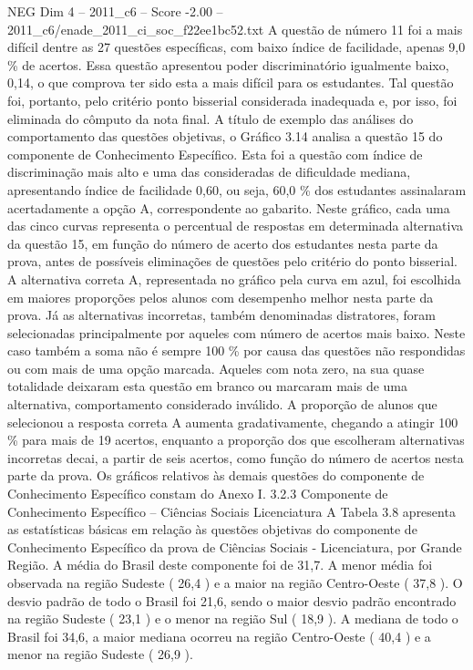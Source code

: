 \begin{textsample}{NEG Dim 4 – 2011\_c6 – Score -2.00 – 2011\_c6/enade\_2011\_ci\_soc\_f22ee1bc52.txt}
A questão de número 11 foi a mais difícil dentre as 27 questões específicas, com baixo índice de facilidade, apenas 9,0 \% de acertos.
Essa questão apresentou poder discriminatório igualmente baixo, 0,14, o que comprova ter sido esta a mais difícil para os estudantes.
Tal questão foi, portanto, pelo critério ponto bisserial considerada inadequada e, por isso, foi eliminada do cômputo da nota final.
A título de exemplo das análises do comportamento das questões objetivas, o Gráfico 3.14 analisa a questão 15 do componente de Conhecimento Específico.
Esta foi a questão com índice de discriminação mais alto e uma das consideradas de dificuldade mediana, apresentando índice de facilidade 0,60, ou seja, 60,0 \% dos estudantes assinalaram acertadamente a opção A, correspondente ao gabarito.
Neste gráfico, cada uma das cinco curvas representa o percentual de respostas em determinada alternativa da questão 15, em função do número de acerto dos estudantes nesta parte da prova, antes de possíveis eliminações de questões pelo critério do ponto bisserial.
A alternativa correta A, representada no gráfico pela curva em azul, foi escolhida em maiores proporções pelos alunos com desempenho melhor nesta parte da prova.
Já as alternativas incorretas, também denominadas distratores, foram selecionadas principalmente por aqueles com número de acertos mais baixo.
Neste caso também a soma não é sempre 100 \% por causa das questões não respondidas ou com mais de uma opção marcada.
Aqueles com nota zero, na sua quase totalidade deixaram esta questão em branco ou marcaram mais de uma alternativa, comportamento considerado inválido.
A proporção de alunos que selecionou a resposta correta A aumenta gradativamente, chegando a atingir 100 \% para mais de 19 acertos, enquanto a proporção dos que escolheram alternativas incorretas decai, a partir de seis acertos, como função do número de acertos nesta parte da prova.
Os gráficos relativos às demais questões do componente de Conhecimento Específico constam do Anexo I. 3.2.3 Componente de Conhecimento Específico – Ciências Sociais Licenciatura A Tabela 3.8 apresenta as estatísticas básicas em relação às questões objetivas do componente de Conhecimento Específico da prova de Ciências Sociais - Licenciatura, por Grande Região.
A média do Brasil deste componente foi de 31,7.
A menor média foi observada na região Sudeste ( 26,4 ) e a maior na região Centro-Oeste ( 37,8 ).
O desvio padrão de todo o Brasil foi 21,6, sendo o maior desvio padrão encontrado na região Sudeste ( 23,1 ) e o menor na região Sul ( 18,9 ).
A mediana de todo o Brasil foi 34,6, a maior mediana ocorreu na região Centro-Oeste ( 40,4 ) e a menor na região Sudeste ( 26,9 ).

\end{textsample}
